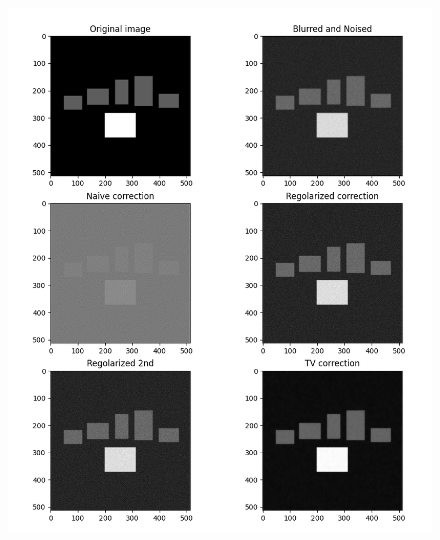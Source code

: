 \documentclass[12pt]{article}
\begin{document}
    \begin{figure}[h!]
    \centering
    \includegraphics[width=14cm]{sample3}
    \end{figure}
    \newpage
\end{document}
